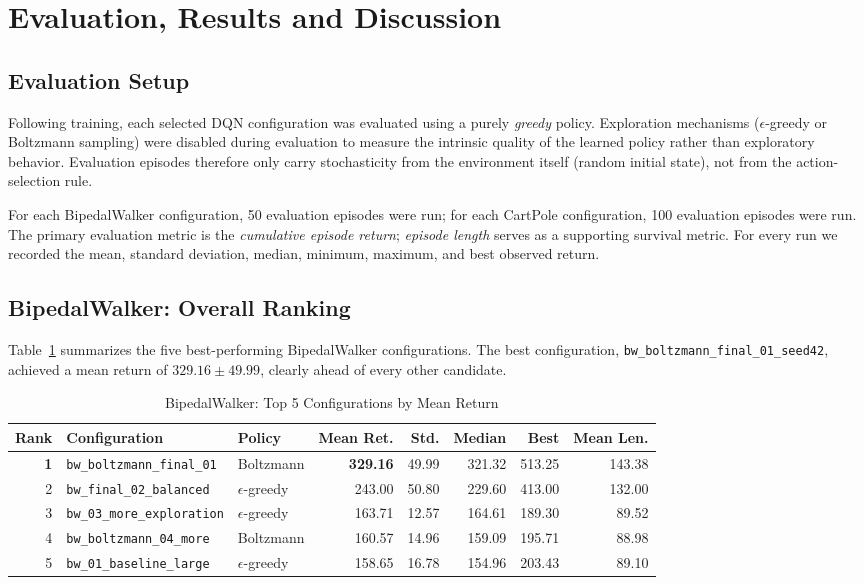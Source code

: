 \section{Evaluation, Results and Discussion}
\label{sec:evaluation}

\subsection{Evaluation Setup}
Following training, each selected DQN configuration was evaluated using a purely \emph{greedy} policy. Exploration mechanisms ($\epsilon$-greedy or Boltzmann sampling) were disabled during evaluation to measure the intrinsic quality of the learned policy rather than exploratory behavior. Evaluation episodes therefore only carry stochasticity from the environment itself (random initial state), not from the action-selection rule.

For each BipedalWalker configuration, 50 evaluation episodes were run; for each CartPole configuration, 100 evaluation episodes were run. The primary evaluation metric is the \textit{cumulative episode return}; \textit{episode length} serves as a supporting survival metric. For every run we recorded the mean, standard deviation, median, minimum, maximum, and best observed return.

\subsection{BipedalWalker: Overall Ranking}
Table~\ref{tab:overall-ranking} summarizes the five best-performing BipedalWalker configurations. The best configuration, \texttt{bw\_boltzmann\_final\_01\_seed42}, achieved a mean return of $329.16 \pm 49.99$, clearly ahead of every other candidate.

\begin{table}[!ht]
    \centering
    \small
    \caption{BipedalWalker: Top 5 Configurations by Mean Return}
    \label{tab:overall-ranking}

    \begin{tabularx}{\textwidth}{rXlrrrrr}
        \toprule
        Rank & Configuration & Policy & Mean Ret. & Std. & Median & Best & Mean Len. \\
        \midrule
        \textbf{1} & \texttt{bw\_boltzmann\_final\_01} & Boltzmann & \textbf{329.16} & 49.99 & 321.32 & 513.25 & 143.38 \\
        2 & \texttt{bw\_final\_02\_balanced} & $\epsilon$-greedy & 243.00 & 50.80 & 229.60 & 413.00 & 132.00 \\
        3 & \texttt{bw\_03\_more\_exploration} & $\epsilon$-greedy & 163.71 & 12.57 & 164.61 & 189.30 & 89.52 \\
        4 & \texttt{bw\_boltzmann\_04\_more} & Boltzmann & 160.57 & 14.96 & 159.09 & 195.71 & 88.98 \\
        5 & \texttt{bw\_01\_baseline\_large} & $\epsilon$-greedy & 158.65 & 16.78 & 154.96 & 203.43 & 89.10 \\
        \bottomrule
    \end{tabularx}
\end{table}

